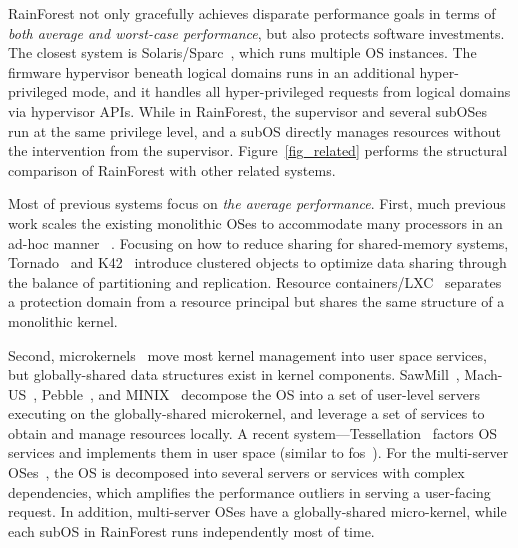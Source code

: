 \documentclass[pageno]{jpaper}
\begin{document}
 RainForest not only gracefully achieves disparate performance goals in terms of \emph{both average and worst-case performance}, but also protects software investments.
The closest system is Solaris/Sparc~\cite{SUN_Dynamic_system_domains}, which runs multiple OS instances. The firmware hypervisor beneath logical domains runs in an additional hyper-privileged mode, and it handles all hyper-privileged requests from logical domains via hypervisor APIs. While in RainForest, the supervisor and several subOSes run at the same privilege level, and a subOS directly manages resources without the intervention from the supervisor. Figure~\ref{fig_related} performs the structural comparison of RainForest with other related systems.



Most of previous systems focus on \emph{the average performance}.
 First, much previous work scales the existing monolithic OSes to accommodate many processors in an ad-hoc manner
~\cite{unrau1995hierarchical, gough2007kernel, guniguntala2008read, mellor1991algorithms, russinovich2008inside}.  Focusing on how to reduce sharing for shared-memory systems, Tornado~\cite{gamsa1999tornado} and K42~\cite{krieger2006k42} introduce clustered objects to optimize data sharing
through the balance of partitioning and replication. Resource containers/LXC~\cite{banga1999resource} separates a protection domain from a resource principal but shares the same structure of a monolithic kernel.

  Second, microkernels~\cite{Ford:1996:MMR:238721.238769, batlivala1992experience, golub1990unix, engler1995exokernel, Elphinstone:2013:LSW:2517349.2522720} move most kernel management into user space services, but globally-shared data structures exist in kernel components. SawMill~\cite{gefflaut2000sawmill}, Mach-US~\cite{julin1995mach}, Pebble~\cite{gabber1999pebble}, and MINIX~\cite{herder2006minix} decompose the OS into a set of user-level servers executing on the globally-shared microkernel, and leverage a set of
services to obtain and manage resources locally.
  A recent system---Tessellation~\cite{Colmenares:2013:TRO:2463209.2488827} factors OS services  and implements them in user space (similar to fos~\cite{wentzlaff2009factored}).  For the multi-server OSes~\cite{gefflaut2000sawmill, julin1995mach, gabber1999pebble, herder2006minix}, the OS is decomposed into several servers or services with complex dependencies, which amplifies the performance outliers in serving a user-facing request. In addition, multi-server OSes have a globally-shared micro-kernel,  while each subOS in RainForest  runs independently most of time.
\end{document}
